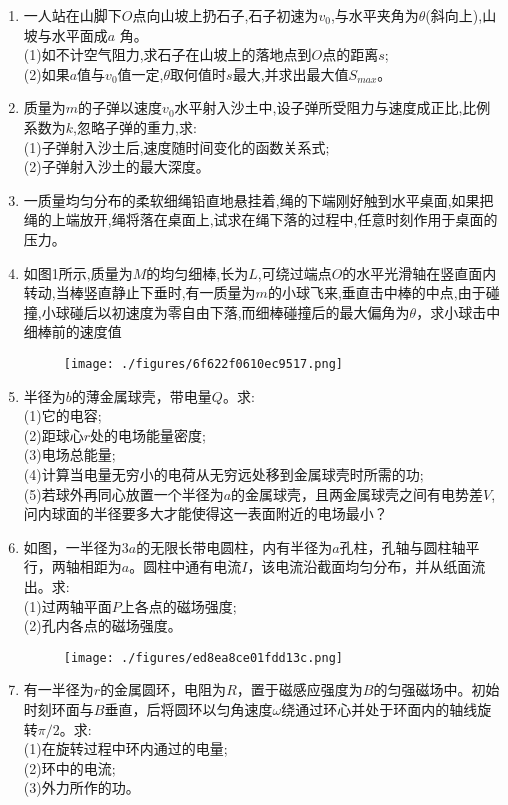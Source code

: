 
\begin{enumerate}
\item 一人站在山脚下$O$点向山坡上扔石子,石子初速为$v_0$,与水平夹角为$\theta$(斜向上),山坡与水平面成$a$ 角。\\
(1)如不计空气阻力,求石子在山坡上的落地点到$O$点的距离$s$;\\
(2)如果$a$值与$v_0$值一定,$\theta$取何值时$s$最大,并求出最大值$S_{max}$。
\item 质量为$m$的子弹以速度$v_0$水平射入沙土中,设子弹所受阻力与速度成正比,比例系数为$k$,忽略子弹的重力,求:\\
(1)子弹射入沙土后,速度随时间变化的函数关系式;\\
(2)子弹射入沙土的最大深度。
\item 一质量均匀分布的柔软细绳铅直地悬挂着,绳的下端刚好触到水平桌面,如果把绳的上端放开,绳将落在桌面上,试求在绳下落的过程中,任意时刻作用于桌面的压力。
\item 如图1所示,质量为$M$的均匀细棒,长为$L$,可绕过端点$O$的水平光滑轴在竖直面内转动,当棒竖直静止下垂时,有一质量为$m$的小球飞来,垂直击中棒的中点,由于碰撞,小球碰后以初速度为零自由下落,而细棒碰撞后的最大偏角为$\theta$，求小球击中细棒前的速度值
\begin{figure}[ht]
\centering
\texttt{[image: ./figures/6f622f0610ec9517.png]}
\caption{} \label{fig_SSD15_1}
\end{figure}
\item 半径为$b$的薄金属球壳，带电量$Q$。求:\\
(1)它的电容;\\
(2)距球心$r$处的电场能量密度;\\
(3)电场总能量;\\
(4)计算当电量无穷小的电荷从无穷远处移到金属球壳时所需的功;\\
(5)若球外再同心放置一个半径为$a$的金属球壳，且两金属球壳之间有电势差$V$,问内球面的半径要多大才能使得这一表面附近的电场最小？
\item 如图，一半径为$3a$的无限长带电圆柱，内有半径为$a$孔柱，孔轴与圆柱轴平行，两轴相距为$a$。圆柱中通有电流$I$，该电流沿截面均匀分布，并从纸面流出。求:\\
(1)过两轴平面$P$上各点的磁场强度;\\
(2)孔内各点的磁场强度。
\begin{figure}[ht]
\centering
\texttt{[image: ./figures/ed8ea8ce01fdd13c.png]}
\caption{} \label{fig_SSD15_2}
\end{figure}
\item 有一半径为$r$的金属圆环，电阻为$R$，置于磁感应强度为$B$的匀强磁场中。初始时刻环面与$B$垂直，后将圆环以匀角速度$\omega$绕通过环心并处于环面内的轴线旋转$\pi/2$。求:\\
(1)在旋转过程中环内通过的电量;\\
(2)环中的电流;\\
(3)外力所作的功。
\end{enumerate}